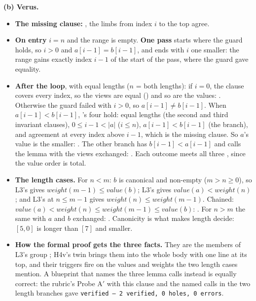 \documentclass[11pt]{article}
\begin{document}
\textbf{(b) Verus.}
\begin{itemize}
\item \textbf{The missing clause:} ,
  the limbs from index $i$ to the top agree.
\item \textbf{On entry} $i = n$ and the range is empty. \textbf{One pass}
  starts where the guard holds, so $i > 0$ and $a[i - 1] = b[i - 1]$, and
  ends with $i$ one smaller: the range gains exactly index $i - 1$ of the start
  of the pass, where the guard gave equality.
\item \textbf{After the loop}, with equal lengths ($n$ = both lengths):
  if $i = 0$, the clause covers every index, so the views are equal
  () and so are the values: . Otherwise the guard
  failed with $i > 0$, so $a[i - 1] \neq b[i - 1]$. When $a[i - 1] < b[i - 1]$,
  's four  hold: equal lengths
  (the second and third invariant clauses), $0 \leq i - 1 < |a|$ ($i \leq n$),
  $a[i - 1] < b[i - 1]$ (the branch), and agreement at every index above
  $i - 1$, which is the missing clause. So $a$'s value is the smaller:
  . The other branch has $b[i - 1] < a[i - 1]$ and calls the lemma
  with the views exchanged: . Each outcome meets all three
  , since the value order is total.
\item \textbf{The length cases.} For $n < m$: $b$ is canonical and non-empty
  ($m > n \geq 0$), so L3's  gives
  $\mathit{weight}(m - 1) \leq \mathit{value}(b)$; L3's
   gives $\mathit{value}(a) <
  \mathit{weight}(n)$; and L3's  at $n \leq m - 1$ gives
  $\mathit{weight}(n) \leq \mathit{weight}(m - 1)$. Chained:
  $\mathit{value}(a) < \mathit{weight}(n) \leq \mathit{weight}(m - 1) \leq
  \mathit{value}(b)$: . For $n > m$ the same with $a$ and $b$
  exchanged: . Canonicity is what makes length decide: $[5, 0]$
  is longer than $[7]$ and smaller.
\item \textbf{How the formal proof gets the three facts.} They are the members
  of L3's group ; H4v's twin brings them into the
  whole body with one  line at its top,
  and their triggers fire on the values and weights the two length cases
  mention. A blueprint that names the three lemma calls instead is equally
  correct: the rubric's Probe A$'$ with this clause and the named calls in the
  two length branches gave \texttt{verified --- 2 verified, 0 holes, 0 errors}.
\end{itemize}
\end{document}
